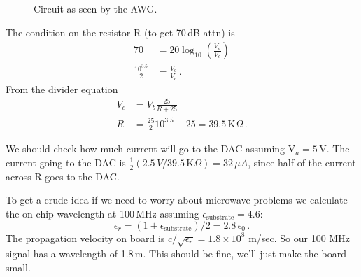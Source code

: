 \begin{figure}[ht]
\begin{centering}
\par\end{centering}
\caption{Circuit as seen by the AWG.}
\label{fig.circuit_as_seen_by_awg}
\end{figure}

The condition on the resistor R (to get 70\,dB attn)  is
\begin{align}
70 &= 20 \log_{10}\left({\frac{V_a}{V_c}}\right) \\
\frac{10^{3.5}}{2} &= \frac{V_b}{V_c} \, .
\end{align}
From the divider equation
\begin{align}
V_c &= V_b \frac{25}{R + 25} \\
R &= \frac{25}{2}10^{3.5} - 25 = 39.5 \, \text{K} \Omega \, .
\end{align}

We should check how much current will go to the DAC assuming $\text{V}_a = 5 \, \text{V}$.
The current going to the DAC is $\frac{1}{2} \left( 2.5 \, V / 39.5 \, \text{K} \Omega \right) = 32 \, \mu A$, since half of the current across R goes to the DAC.

To get a crude idea if we need to worry about microwave problems we calculate the on-chip wavelength at 100\,MHz assuming $\epsilon_{\text{substrate}} = 4.6$:
\begin{equation}
\epsilon_{r} = (1+\epsilon_{\text{substrate}})/2 = 2.8\,\epsilon_0 \, .
\end{equation}
The propagation velocity on board is $c/\sqrt{\epsilon_r} = 1.8 \times 10^8$ m/sec.
So our 100 MHz signal has a wavelength of 1.8\,m.
This should be fine, we'll just make the board small.

